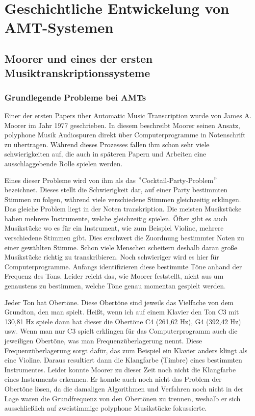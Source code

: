 \section{Geschichtliche Entwickelung von AMT-Systemen}

\subsection{Moorer und eines der ersten Musiktranskriptionssysteme}
\subsubsection{Grundlegende Probleme bei AMTs}
Einer der ersten Papers über Automatic Music Transcription wurde von James A. Moorer im Jahr 1977 geschrieben.
\cite{Moorer1977}
In diesem beschreibt Moorer seinen Ansatz, polyphone Musik Audiospuren
direkt über Computerprogramme in Notenschrift zu übertragen.
Während dieses Prozesses fallen ihm schon sehr viele schwierigkeiten auf, die auch in späteren Papern und Arbeiten
eine ausschlaggebende Rolle spielen werden.

Eines dieser Probleme wird von ihm als das \("\)Cocktail-Party-Problem\("\) bezeichnet.
Dieses stellt die Schwierigkeit dar, auf einer Party bestimmten Stimmen zu folgen, während viele verschiedene Stimmen
gleichzeitig erklingen.
Das gleiche Problem liegt in der Noten transkription.
Die meisten Musikstücke haben mehrere Instrumente, welche gleichzeitig spielen.
Öfter gibt es auch Musikstücke wo es für ein Instrument, wie zum Beispiel Violine, mehrere verschiedene Stimmen gibt.
Dies erschwert die Zuordnung bestimmter Noten zu einer gewählten Stimme.
Schon viele Menschen scheitern deshalb daran große Musikstücke richtig zu transkribieren.
Noch schwieriger wird es hier für Computerprogramme.
Anfangs identifizieren diese bestimmte Töne anhand der Frequenz des Tons.
Leider reicht das, wie Moorer feststellt, nicht aus um genaustens zu bestimmen,
welche Töne genau momentan gespielt werden.

Jeder Ton hat Obertöne.
Diese Obertöne sind jeweils das Vielfache von dem Grundton, den man spielt.
Heißt, wenn ich auf einem Klavier den Ton C3 mit 130,81 Hz spiele dann hat dieser
die Obertöne C4 (261,62 Hz), G4 (392,42 Hz) usw.
Wenn man nur C3 spielt erklingen für das Computerprogramm auch die jeweiligen Obertöne,
was man Frequenzüberlagerung nennt.
Diese Frequenzüberlagerung sorgt dafür, das zum Beispiel ein Klavier anders klingt als eine Violine.
Daraus resultiert dann die Klangfarbe (Timbre) eines bestimmten Instrumentes.
\cite{goswami2013timbre}
Leider konnte Moorer zu dieser Zeit noch nicht die Klangfarbe eines Instruments erkennen.
Er konnte auch noch nicht das Problem der Obertöne lösen,
da die damaligen Algorithmen und Verfahren noch nicht in der Lage waren die Grundfrequenz von den Obertönen zu trennen,
weshalb er sich ausschließlich auf zweistimmige polyphone Musikstücke fokussierte.

